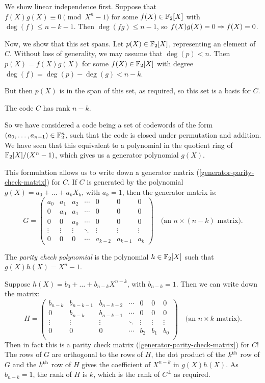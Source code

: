 \documentclass{article}
\begin{document}
\begin{prf}
    We show linear independence first. Suppose that $f(X)g(X) \equiv 0 \pmod{X^n-1}$ for some $f(X) \in \mathbb{F}_2[X]$ with $\deg(f) \leq n - k - 1$. Then $\deg(fg) \leq n-1$, so $f(X)g(X) = 0 \Rightarrow f(X)=0$.
    
    Now, we show that this set spans. Let $p(X) \in \mathbb{F}_2[X]$, representing an element of $C$. Without loss of generality, we may assume that $\deg(p) < n$. Then $p(X) = f(X)g(X)$ for some $f(X) \in \mathbb{F}_2[X]$ with degree $\deg(f) = \deg(p) - \deg(g) < n - k$.
    
    But then $p(X)$ is in the span of this set, as required, so this set is a basis for $C$.
\end{prf}

\begin{corollary}
    The code $C$ has rank $n - k$.
\end{corollary}

So we have considered a code being a set of codewords of the form $(a_0, \dots, a_{n-1}) \in \mathbb{F}_2^n$, such that the code is closed under permutation and addition. We have seen that this equivalent to a polynomial in the quotient ring of $\mathbb{F}_2[X] / (X^n-1)$, which gives us a generator polynomial $g(X)$.

This formulation allows us to write down a generator matrix (\ref{generator-parity-check-matrix}) for $C$. If $C$ is generated by the polynomial $g(X) = a_0 + \dots + a_k X_k$, with $a_k = 1$, then the generator matrix is:
\[
G = \begin{pmatrix}
	a_0 & a_1 & a_2 & \cdots & 0 & 0 & 0 \\
	0 & a_0 & a_1 & \cdots & 0 & 0 & 0 \\
	0 & 0 & a_0 & \cdots & 0 & 0 & 0 \\
	\vdots & \vdots & \vdots & \ddots & \vdots & \vdots & \vdots \\
	0 & 0 & 0 & \cdots & a_{k-2} & a_{k-1} & a_k
\end{pmatrix}
\quad
\text{(an $n \times (n-k)$ matrix).}
\]
\begin{definition}
    The \textit{parity check polynomial} is the polynomial $h \in \mathbb{F}_2[X]$ such that $g(X)h(X) = X^n-1$.
\end{definition}

Suppose $h(X) = b_0 + \dots + b_{n-k}X^{n-k}$, with $b_{n-k} = 1$. Then we can write down the matrix:
\[
H = \begin{pmatrix}
	b_{n-k} & b_{n-k-1} & b_{n-k-2} & \cdots & 0 & 0 & 0 \\
	0 & b_{n-k} & b_{n-k-1} & \cdots & 0 & 0 & 0 \\
	\vdots & \vdots & \vdots & \ddots & \vdots & \vdots & \vdots \\
	0 & 0 & 0 & \cdots & b_2 & b_1 & b_0 \\
\end{pmatrix}
\quad
\text{(an $n \times k$ matrix).}
\]
Then in fact this is a parity check matrix (\ref{generator-parity-check-matrix}) for $C$! The rows of $G$ are orthogonal to the rows of $H$, the dot product of the $k^{\text{th}}$ row of $G$ and the $k^{\text{th}}$ row of $H$ gives the coefficient of $X^{n-k}$ in $g(X)h(X)$. As $b_{n-k} = 1$, the rank of $H$ is $k$, which is the rank of $C^\bot$ as required.
\end{document}
